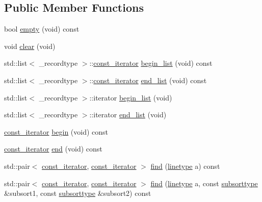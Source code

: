\subsection*{Public Member Functions}
\begin{DoxyCompactItemize}
\item 
bool \mbox{\hyperlink{classrangemap_a53aa8a0c0d7a81df126f69a8ad2ba8de}{empty}} (void) const
\item 
void \mbox{\hyperlink{classrangemap_a3177313d3673b5b4b2ea5ed44f022d2a}{clear}} (void)
\item 
std\+::list$<$ \+\_\+recordtype $>$\+::\mbox{\hyperlink{classrangemap_affa7462e68d053d3a066fe0b8d46a99d}{const\+\_\+iterator}} \mbox{\hyperlink{classrangemap_a9ec057fb877cddd092b693a6f80f99af}{begin\+\_\+list}} (void) const
\item 
std\+::list$<$ \+\_\+recordtype $>$\+::\mbox{\hyperlink{classrangemap_affa7462e68d053d3a066fe0b8d46a99d}{const\+\_\+iterator}} \mbox{\hyperlink{classrangemap_af3abc0a8d0c173ce01ed92f60b639462}{end\+\_\+list}} (void) const
\item 
std\+::list$<$ \+\_\+recordtype $>$\+::iterator \mbox{\hyperlink{classrangemap_acea6b302623df7d3b11df5aca28f72f2}{begin\+\_\+list}} (void)
\item 
std\+::list$<$ \+\_\+recordtype $>$\+::iterator \mbox{\hyperlink{classrangemap_aaba1aa6af1a8eebaa1d4c915d0b59d21}{end\+\_\+list}} (void)
\item 
\mbox{\hyperlink{classrangemap_affa7462e68d053d3a066fe0b8d46a99d}{const\+\_\+iterator}} \mbox{\hyperlink{classrangemap_a8c2bf606a25b684284656382be0ba469}{begin}} (void) const
\item 
\mbox{\hyperlink{classrangemap_affa7462e68d053d3a066fe0b8d46a99d}{const\+\_\+iterator}} \mbox{\hyperlink{classrangemap_a94d0670391a58a9f30031801c4eeff49}{end}} (void) const
\item 
std\+::pair$<$ \mbox{\hyperlink{classrangemap_affa7462e68d053d3a066fe0b8d46a99d}{const\+\_\+iterator}}, \mbox{\hyperlink{classrangemap_affa7462e68d053d3a066fe0b8d46a99d}{const\+\_\+iterator}} $>$ \mbox{\hyperlink{classrangemap_a1a9e4bf2a0972dd23183e55bd3f40f49}{find}} (\mbox{\hyperlink{classrangemap_a54c8f7622f9af4c4232d764cf9ed11fa}{linetype}} a) const
\item 
std\+::pair$<$ \mbox{\hyperlink{classrangemap_affa7462e68d053d3a066fe0b8d46a99d}{const\+\_\+iterator}}, \mbox{\hyperlink{classrangemap_affa7462e68d053d3a066fe0b8d46a99d}{const\+\_\+iterator}} $>$ \mbox{\hyperlink{classrangemap_abb505277cefe8819c7100b5fb5a4deb5}{find}} (\mbox{\hyperlink{classrangemap_a54c8f7622f9af4c4232d764cf9ed11fa}{linetype}} a, const \mbox{\hyperlink{classrangemap_aeef55d9063b5d89e075229fad91ea631}{subsorttype}} \&subsort1, const \mbox{\hyperlink{classrangemap_aeef55d9063b5d89e075229fad91ea631}{subsorttype}} \&subsort2) const

\end{DoxyCompactItemize}
